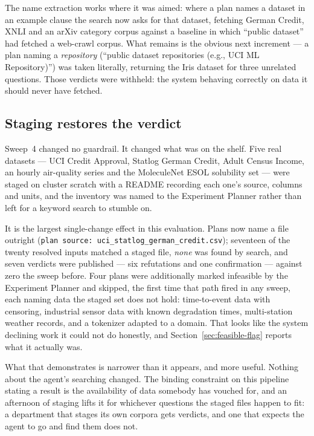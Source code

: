 The name extraction works where it was aimed: where a plan names a dataset in an
example clause the search now asks for that dataset, fetching German Credit, XNLI
and an arXiv category corpus against a baseline in which ``public dataset'' had
fetched a web-crawl corpus. What remains is the obvious next increment --- a plan
naming a \emph{repository} (``public dataset repositories (e.g., UCI ML
Repository)'') was taken literally, returning the Iris dataset for three unrelated
questions. Those verdicts were withheld: the system behaving correctly on data it
should never have fetched.

\subsection{Staging restores the verdict}
\label{sec:staging-restores}

Sweep~4 changed no guardrail. It changed what was on the shelf. Five real datasets
--- UCI Credit Approval, Statlog German Credit, Adult Census Income, an hourly
air-quality series and the MoleculeNet ESOL solubility set --- were staged on
cluster scratch with a README recording each one's source, columns and units, and
the inventory was named to the Experiment Planner rather than left for a keyword
search to stumble on.

It is the largest single-change effect in this evaluation. Plans now name a file
outright (\texttt{plan source: uci\_statlog\_german\_credit.csv}); seventeen of the
twenty resolved inputs matched a staged file, \emph{none} was found by search, and
seven verdicts were published --- six refutations and one confirmation --- against
zero the sweep before. Four plans were additionally marked infeasible by the
Experiment Planner and skipped, the first time that path fired in any sweep, each
naming data the staged set does not hold: time-to-event data with censoring,
industrial sensor data with known degradation times, multi-station weather records,
and a tokenizer adapted to a domain. That looks like the system declining work it
could not do honestly, and Section~\ref{sec:feasible-flag} reports what it
actually was.

What that demonstrates is narrower than it appears, and more useful. Nothing about
the agent's searching changed. The binding constraint on this pipeline stating a
result is the availability of data somebody has vouched for, and an afternoon of
staging lifts it for whichever questions the staged files happen to fit: a
department that stages its own corpora gets verdicts, and one that expects the
agent to go and find them does not.

